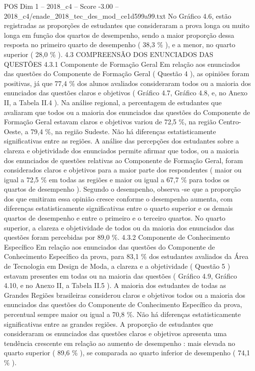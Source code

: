\begin{textsample}{POS Dim 1 – 2018\_c4 – Score -3.00 – 2018\_c4/enade\_2018\_tec\_des\_mod\_ce1d599a99.txt}
No Gráfico 4.6, estão registradas as proporções de estudantes que consideraram a prova longa ou muito longa em função dos quartos de desempenho, sendo a maior proporção dessa resposta no primeiro quarto de desempenho ( 38,3 \% ), e a menor, no quarto superior ( 28,0 \% ). 4.3 COMPREENSÃO DOS ENUNCIADOS DAS QUESTÕES 4.3.1 Componente de Formação Geral Em relação aos enunciados das questões do Componente de Formação Geral ( Questão 4 ), as opiniões foram positivas, já que 77,4 \% dos alunos avaliados consideraram todos ou a maioria dos enunciados das questões claros e objetivos ( Gráfico 4.7, Gráfico 4.8, e, no Anexo II, a Tabela II.4 ).
Na análise regional, a percentagem de estudantes que avaliaram que todos ou a maioria dos enunciados das questões do Componente de Formação Geral estavam claros e objetivos variou de 72,5 \%, na região Centro-Oeste, a 79,4 \%, na região Sudeste.
Não há diferenças estatisticamente significativas entre as regiões.
A análise das percepções dos estudantes sobre a clareza e objetividade dos enunciados permite afirmar que todos, ou a maioria dos enunciados de questões relativas ao Componente de Formação Geral, foram considerados claros e objetivos para a maior parte dos respondentes ( maior ou igual a 72,5 \% em todas as regiões e maior ou igual a 67,7 \% para todos os quartos de desempenho ).
Segundo o desempenho, observa -se que a proporção dos que emitiram essa opinião cresce conforme o desempenho aumenta, com diferenças estatisticamente significativas entre o quarto superior e os demais quartos de desempenho e entre o primeiro e o terceiro quartos.
No quarto superior, a clareza e objetividade de todos ou da maioria dos enunciados das questões foram percebidas por 89,0 \%. 4.3.2 Componente de Conhecimento Específico Em relação aos enunciados das questões do Componente de Conhecimento Específico da prova, para 83,1 \% dos estudantes avaliados da Área de Tecnologia em Design de Moda, a clareza e a objetividade ( Questão 5 ) estavam presentes em todas ou na maioria das questões ( Gráfico 4.9, Gráfico 4.10, e no Anexo II, a Tabela II.5 ).
A maioria dos estudantes de todas as Grandes Regiões brasileiras considerou claros e objetivos todos ou a maioria dos enunciados das questões do Componente de Conhecimento Específico da prova, percentual sempre maior ou igual a 70,8 \%.
Não há diferenças estatisticamente significativas entre as grandes regiões.
A proporção de estudantes que consideraram os enunciados das questões claros e objetivos apresenta uma tendência crescente em relação ao aumento de desempenho : mais elevada no quarto superior ( 89,6 \% ), se comparada ao quarto inferior de desempenho ( 74,1 \% ).

\end{textsample}
